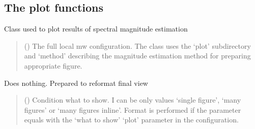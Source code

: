 \documentclass[letterpaper,10pt,english]{sphinxmanual}
\begin{document}

\subsection{The plot functions}
\label{\detokenize{api_support:the-plot-functions}}\label{\detokenize{api_support:module-amw.mw.plot}}

\begin{fulllineitems}
\label{\detokenize{api_support:amw.mw.plot.PlotMw}}
\pysigstartsignatures
{}
\pysigstopsignatures
\sphinxAtStartPar
Class used to plot results of spectral magnitude estimation
\begin{quote}\begin{description}
\sphinxAtStartPar
{} () \textendash{} The full local mw configuration. The class uses the ‘plot’ subdirectory
and ‘method’ describing the magnitude estimation method for preparing appropriate figure.

\end{description}\end{quote}

\begin{fulllineitems}
\label{\detokenize{api_support:amw.mw.plot.PlotMw.format_plot}}
\pysigstartsignatures
{}
\pysigstopsignatures
\sphinxAtStartPar
Does nothing. Prepared to reformat final view
\begin{quote}\begin{description}
\sphinxAtStartPar
{} () \textendash{} Condition what to show. I can be only values ‘single figure’, ‘many figures’ or
‘many figures inline’. Format is performed if the parameter equals with the ‘what to show’ ‘plot’
parameter in the configuration.


\end{description}
\end{quote}
\end{fulllineitems}
\end{fulllineitems}
\end{document}
